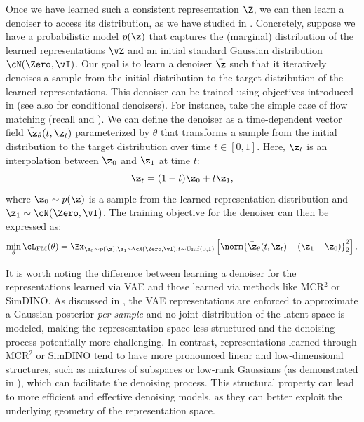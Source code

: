 \documentclass[../../book-main.tex]{subfiles}
\begin{document}
Once we have learned such a consistent representation $\Z$, we can then learn
a denoiser to access its distribution, as we have studied in
. Concretely, suppose we have a probabilistic model $p(\z)$
that captures the (marginal) distribution of the learned representations $\vZ$ and an
initial standard Gaussian distribution $\cN(\Zero, \vI)$. Our goal is to learn
a denoiser $\bar{\z}$ such that it iteratively denoises a sample from the
initial distribution to the target distribution of the learned representations.
This denoiser can be trained using objectives introduced in 
(see also  for conditional denoisers). For
instance, take the simple case of flow matching (recall
 and
). We can define the denoiser as a time-dependent vector field $\bar{\z}_{\theta}(t, \z_t)$ parameterized by $\theta$ that transforms a sample from the initial distribution to the target distribution over time $t \in [0, 1]$. Here, $\z_t$ is an interpolation between $\z_0$ and $\z_1$ at time $t$:
\begin{equation}
    \z_t = (1 - t)\z_0 + t\z_1,
\end{equation}
where $\z_0 \sim p(\z)$ is a sample from the learned representation distribution
and $\z_1 \sim \cN(\Zero, \vI)$.
The training objective for the denoiser can then be expressed as:
\begin{equation}
    \min_{\theta} \cL_{\mathrm{FM}}(\theta) = \Ex_{\z_0 \sim p(\z), \z_1 \sim
    \cN(\Zero, \vI), t \sim \mathrm{Unif}(0, 1)} \left[ \norm{\bar{\z}_{\theta}(t,\z_t) - (\z_1 - \z_0)}_2^2 \right].
\end{equation}


It is worth noting the difference between learning a denoiser for the
representations learned via VAE and those learned via methods like MCR$^2$ or
SimDINO. As discussed in , the VAE representations are enforced to approximate a Gaussian posterior \textit{per sample} and no joint distribution of the latent space is modeled, making the represesntation space less structured and the denoising process potentially more challenging. In contrast, representations learned through MCR$^2$ or SimDINO tend to have more pronounced linear and low-dimensional structures, such as mixtures of subspaces or low-rank Gaussians (as demonstrated in ), which can facilitate the denoising process. This structural property can lead to more efficient and effective denoising models, as they can better exploit the underlying geometry of the representation space. 
\end{document}
